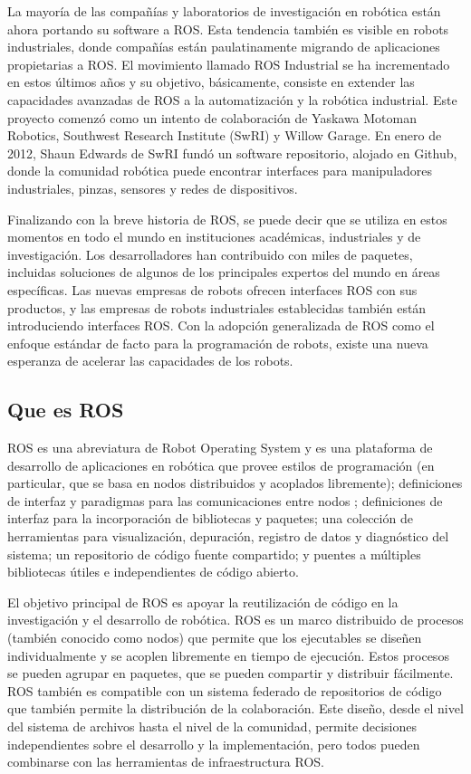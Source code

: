         La mayoría de las compañías y laboratorios de investigación en robótica están ahora portando su software a ROS. Esta tendencia también es visible en robots industriales, donde compañías están paulatinamente migrando de aplicaciones propietarias a ROS. El movimiento llamado ROS Industrial se ha incrementado en estos últimos años y su objetivo, básicamente, consiste en extender las capacidades avanzadas de ROS a la automatización y la robótica industrial. Este proyecto comenzó como un intento de colaboración de Yaskawa Motoman Robotics, Southwest Research Institute (SwRI) y Willow Garage. En enero de 2012, Shaun Edwards de SwRI fundó un software repositorio, alojado en Github, donde la comunidad robótica puede encontrar interfaces para manipuladores industriales, pinzas, sensores y redes de dispositivos.
        
        
        Finalizando con la breve historia de ROS, se puede decir que se utiliza en estos momentos en todo el mundo en instituciones académicas, industriales y de investigación. Los desarrolladores han contribuido con miles de paquetes, incluidas soluciones de algunos de los principales expertos del mundo en áreas específicas. Las nuevas empresas de robots ofrecen interfaces ROS con sus productos, y las empresas de robots industriales establecidas también están introduciendo interfaces ROS. Con la adopción generalizada de ROS como el enfoque estándar de facto para la programación de robots, existe una nueva esperanza de acelerar las capacidades de los robots.

    \subsection{Que es ROS}
       ROS es una abreviatura de  Robot Operating System y es una plataforma de desarrollo de aplicaciones en robótica que provee estilos de programación (en particular, que se basa en nodos distribuidos y acoplados libremente); definiciones de interfaz y paradigmas para las comunicaciones entre nodos ; definiciones de interfaz para la incorporación de bibliotecas y paquetes; una colección de herramientas para visualización, depuración, registro de datos y diagnóstico del sistema; un repositorio de código fuente compartido; y puentes a múltiples bibliotecas útiles e independientes de código abierto.
       
       El objetivo principal de ROS es apoyar la reutilización de código en la investigación y el desarrollo de robótica. ROS es un marco distribuido de procesos (también conocido como nodos) que permite que los ejecutables se diseñen individualmente y se acoplen libremente en tiempo de ejecución. Estos procesos se pueden agrupar en paquetes, que se pueden compartir y distribuir fácilmente. ROS también es compatible con un sistema federado de repositorios de código que también permite la distribución de la colaboración. Este diseño, desde el nivel del sistema de archivos hasta el nivel de la comunidad, permite decisiones independientes sobre el desarrollo y la implementación, pero todos pueden combinarse con las herramientas de infraestructura ROS.
       
